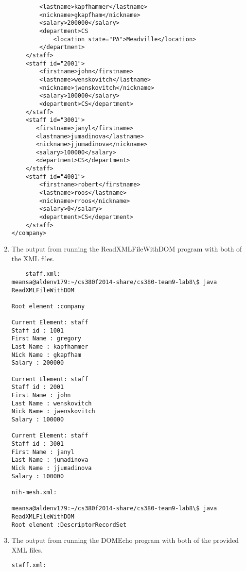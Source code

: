\documentclass[11pt,english]{article}
\begin{document}
\begin{enumerate}
\begin{lstlisting}
        <lastname>kapfhammer</lastname>
        <nickname>gkapfham</nickname>
        <salary>200000</salary>
        <department>CS
            <location state="PA">Meadville</location>
        </department>
    </staff>
    <staff id="2001">
        <firstname>john</firstname>
        <lastname>wenskovitch</lastname>
        <nickname>jwenskovitch</nickname>
        <salary>100000</salary>
        <department>CS</department>
    </staff>
    <staff id="3001">
	   <firstname>janyl</firstname>
	   <lastname>jumadinova</lastname>
	   <nickname>jjumadinova</nickname>
	   <salary>100000</salary>
       <department>CS</department>
    </staff>
    <staff id="4001">
        <firstname>robert</firstname>
        <lastname>roos</lastname>
        <nickname>rroos</nickname>
        <salary>0</salary>
        <department>CS</department>
    </staff>
</company>

\end{lstlisting}
\newpage
\item The output from running the 
ReadXMLFileWithDOM program with both of the XML files.
\begin{lstlisting}
	staff.xml:
meansa@aldenv179:~/cs380f2014-share/cs380-team9-lab8\$ java ReadXMLFileWithDOM 

Root element :company

Current Element: staff
Staff id : 1001
First Name : gregory
Last Name : kapfhammer
Nick Name : gkapfham
Salary : 200000

Current Element: staff
Staff id : 2001
First Name : john
Last Name : wenskovitch
Nick Name : jwenskovitch
Salary : 100000

Current Element: staff
Staff id : 3001
First Name : janyl
Last Name : jumadinova
Nick Name : jjumadinova
Salary : 100000

nih-mesh.xml:

meansa@aldenv179:~/cs380f2014-share/cs380-team9-lab8\$ java ReadXMLFileWithDOM 
Root element :DescriptorRecordSet
	\end{lstlisting}

\newpage
\item The output from running the DOMEcho program with both of the provided XML files.
\begin{lstlisting}
staff.xml:


\end{lstlisting}
\end{enumerate}
\end{document}
